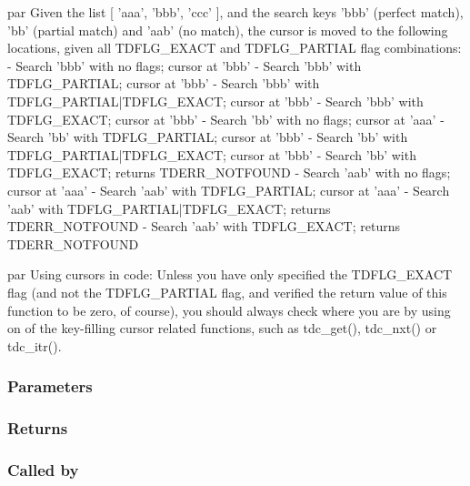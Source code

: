  par
 Given the list [ 'aaa', 'bbb', 'ccc' ], and the search keys
 'bbb' (perfect match), 'bb' (partial match) and 'aab' (no match),
 the cursor is moved to the following locations, given all TDFLG\_EXACT
 and TDFLG\_PARTIAL flag combinations:
 - Search 'bbb' with no flags; cursor at 'bbb'
 - Search 'bbb' with TDFLG\_PARTIAL; cursor at 'bbb'
 - Search 'bbb' with TDFLG\_PARTIAL|TDFLG\_EXACT; cursor at 'bbb'
 - Search 'bbb' with TDFLG\_EXACT; cursor at 'bbb'
 - Search 'bb' with no flags; cursor at 'aaa'
 - Search 'bb' with TDFLG\_PARTIAL; cursor at 'bbb'
 - Search 'bb' with TDFLG\_PARTIAL|TDFLG\_EXACT; cursor at 'bbb'
 - Search 'bb' with TDFLG\_EXACT; returns TDERR\_NOTFOUND
 - Search 'aab' with no flags; cursor at 'aaa'
 - Search 'aab' with TDFLG\_PARTIAL; cursor at 'aaa'
 - Search 'aab' with TDFLG\_PARTIAL|TDFLG\_EXACT; returns TDERR\_NOTFOUND
 - Search 'aab' with TDFLG\_EXACT; returns TDERR\_NOTFOUND

 par Using cursors in code:
 Unless you have only specified the TDFLG\_EXACT flag (and not the
 TDFLG\_PARTIAL flag, and verified the return value of this
 function to be zero, of course), you should always check where you are
 by using on of the key-filling cursor related functions, such as
 tdc\_get(), tdc\_nxt() or tdc\_itr().
 

\subsubsection{Parameters}
\subsubsection{Returns}
\subsubsection{Called by}
